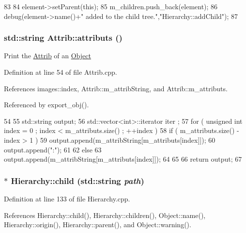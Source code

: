 \begin{DoxyCode}
83                                           {
84   element->setParent(this);
85   m_children.push_back(element);
86   debug(element->name()+" added to the child tree.","Hierarchy::addChild");
87 }
\end{DoxyCode}
\hypertarget{classAttrib_aee7bbf16b144887f196e1341b24f8a26}{
\subsubsection[{attributs}]{\setlength{\rightskip}{0pt plus 5cm}std::string Attrib::attributs ()}}
\label{classAttrib_aee7bbf16b144887f196e1341b24f8a26}
Print the \hyperlink{classAttrib}{Attrib} of an \hyperlink{classObject}{Object} 

Definition at line 54 of file Attrib.cpp.

References images::index, Attrib::m\_\-attribString, and Attrib::m\_\-attributs.

Referenced by export\_\-obj().


\begin{DoxyCode}
54                             {
55   std::string output;
56   std::vector<int>::iterator iter ;
57   for ( unsigned int index = 0 ; index < m_attributs.size() ; ++index ) {
58     if ( m_attributs.size() - index > 1 ) {
59       output.append(m_attribString[m_attributs[index]]);
60       output.append(":");
61     }
62     else {
63       output.append(m_attribString[m_attributs[index]]);
64     }
65   }
66   return output;
67 }
\end{DoxyCode}
\hypertarget{classHierarchy_a1e207f973c694b538bf90107b4868817}{
\subsubsection[{child}]{ $\ast$ Hierarchy::child (std::string {\em path})}}
\label{classHierarchy_a1e207f973c694b538bf90107b4868817}


Definition at line 133 of file Hierarchy.cpp.

References Hierarchy::child(), Hierarchy::children(), Object::name(), Hierarchy::origin(), Hierarchy::parent(), and Object::warning().

